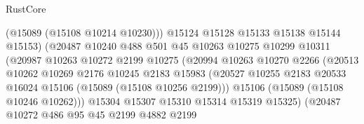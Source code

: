 \begin{lexlean}{RustCore}
\begin{coremodule}
                                      (@15089 (@15108 @10214 @10230)))
                                    @15124
                                    @15128
                                    @15133
                                    @15138
                                    @15144
                                    @15153)
                                  (@20487
                                    @10240
                                    @488
                                    @501
                                    @45
                                    @10263
                                    @10275
                                    @10299
                                    @10311
                                    (@20987
                                      @10263
                                      @10272
                                      @2199
                                      @10275
                                      (@20994
                                        @10263
                                        @10270
                                        @2266
                                        (@20513
                                          @10262
                                          @10269
                                          @2176
                                          @10245
                                          @2183
                                          @15983
                                          (@20527
                                            @10255
                                            @2183
                                            @20533
                                            @16024
                                            @15106
                                            (@15089 (@15108 @10256 @2199)))
                                          @15106
                                          (@15089 (@15108 @10246 @10262)))
                                        @15304
                                        @15307
                                        @15310
                                        @15314
                                        @15319
                                        @15325)
                                      (@20487
                                        @10272
                                        @486
                                        @95
                                        @45
                                        @2199
                                        @4882
                                        @2199

\end{coremodule}
\end{lexlean}
